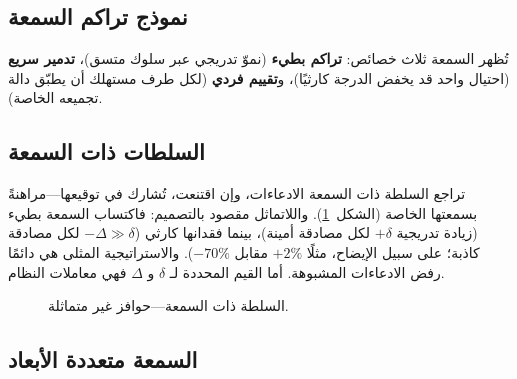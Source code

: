 \documentclass[11pt,a4paper,twocolumn]{article}
\begin{document}
\subsection{نموذج تراكم السمعة}

تُظهر السمعة ثلاث خصائص: \textbf{تراكم بطيء} (نموّ تدريجي عبر سلوك متسق)، \textbf{تدمير سريع} (احتيال واحد قد يخفض الدرجة كارثيًا)، و\textbf{تقييم فردي} (لكل طرف مستهلك أن يطبّق دالة تجميعه الخاصة).

\subsection{السلطات ذات السمعة}

تراجع السلطة ذات السمعة الادعاءات، وإن اقتنعت، تُشارك في توقيعها---مراهنةً بسمعتها الخاصة (الشكل~\ref{fig:authority}). واللاتماثل مقصود بالتصميم: فاكتساب السمعة بطيء (زيادة تدريجية $+\delta$ لكل مصادقة أمينة)، بينما فقدانها كارثي ($-\Delta \gg \delta$ لكل مصادقة كاذبة؛ على سبيل الإيضاح، مثلًا $+2\%$ مقابل $-70\%$). والاستراتيجية المثلى هي دائمًا رفض الادعاءات المشبوهة. أما القيم المحددة لـ $\delta$ و $\Delta$ فهي معاملات النظام.

\begin{figure}[ht]
\centering
{}
\caption{السلطة ذات السمعة---حوافز غير متماثلة.}
\label{fig:authority}
\end{figure}

\subsection{السمعة متعددة الأبعاد}
\end{document}
